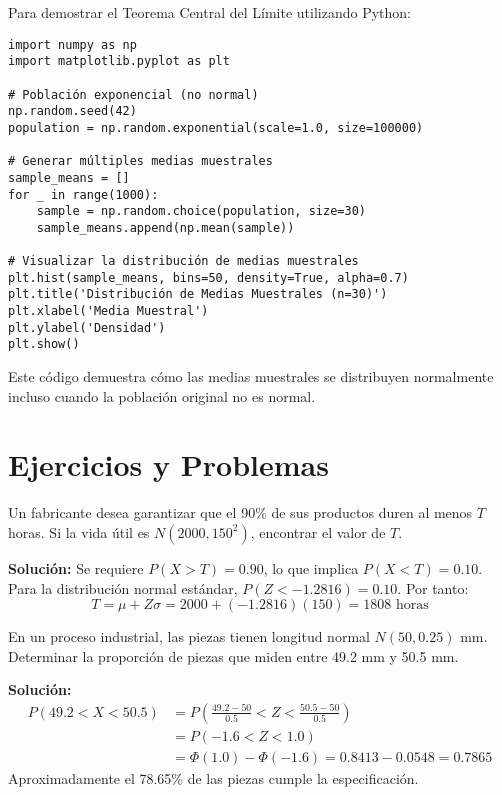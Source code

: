\begin{example}
Para demostrar el Teorema Central del Límite utilizando Python:
\begin{verbatim}
import numpy as np
import matplotlib.pyplot as plt

# Población exponencial (no normal)
np.random.seed(42)
population = np.random.exponential(scale=1.0, size=100000)

# Generar múltiples medias muestrales
sample_means = []
for _ in range(1000):
    sample = np.random.choice(population, size=30)
    sample_means.append(np.mean(sample))

# Visualizar la distribución de medias muestrales
plt.hist(sample_means, bins=50, density=True, alpha=0.7)
plt.title('Distribución de Medias Muestrales (n=30)')
plt.xlabel('Media Muestral')
plt.ylabel('Densidad')
plt.show()
\end{verbatim}
Este código demuestra cómo las medias muestrales se distribuyen normalmente incluso cuando la población original no es normal.
\end{example}

\section{Ejercicios y Problemas}

\begin{example}
Un fabricante desea garantizar que el 90\% de sus productos duren al menos $T$ horas. Si la vida útil es $N(2000, 150^2)$, encontrar el valor de $T$.

\textbf{Solución:} Se requiere $P(X > T) = 0.90$, lo que implica $P(X < T) = 0.10$.
Para la distribución normal estándar, $P(Z < -1.2816) = 0.10$.
Por tanto:
\begin{equation}
T = \mu + Z\sigma = 2000 + (-1.2816)(150) = 1808 \text{ horas}
\end{equation}
\end{example}

\begin{example}
En un proceso industrial, las piezas tienen longitud normal $N(50, 0.25)$ mm. Determinar la proporción de piezas que miden entre 49.2 mm y 50.5 mm.

\textbf{Solución:}
\begin{align}
P(49.2 < X < 50.5) &= P\left(\frac{49.2-50}{0.5} < Z < \frac{50.5-50}{0.5}\right)\\
&= P(-1.6 < Z < 1.0)\\
&= \Phi(1.0) - \Phi(-1.6) = 0.8413 - 0.0548 = 0.7865
\end{align}
Aproximadamente el 78.65\% de las piezas cumple la especificación.
\end{example}

